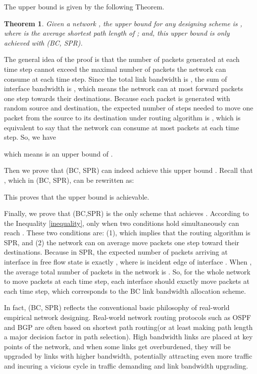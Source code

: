 \documentclass[journal]{IEEEtran}
\begin{document}
{The upper bound  is given by the following Theorem.
\newtheorem{thm}{Theorem}
\begin{thm}
\label{theorem} Given a network , the upper bound  for any
designing scheme is , where  is the average shortest path
length of ; and, this upper bound is only achieved with (BC,
SPR).
\end{thm}
\begin{IEEEproof}
The general idea of the proof is that the number of packets
generated at each time step cannot exceed the maximal number of
packets the network can consume at each time step. Since the total
link bandwidth is , the sum of interface bandwidth is , which
means the network can at most forward  packets one step towards
their destinations. Because each packet is generated with random
source and destination, the expected number of steps needed to move
one packet from the source to its destination under routing
algorithm  is , which is equivalent to say that
the network can consume at most  packets at each time
step. So, we have

which means  is an upper bound of .

Then we prove that (BC, SPR) can indeed achieve this upper bound
. Recall that , which
in (BC, SPR), can be rewritten as:

This proves that the upper bound  is achievable.

Finally, we prove that (BC,SPR) is the only scheme that achieves
. According to the Inequality \ref{inequality}, only when
two conditions hold simultaneously can  reach . These two
conditions are: (1), which implies that the routing
algorithm is SPR, and (2) the network can on average move 
packets one step toward their destinations.  Because in SPR, the
expected number of packets arriving at interface  in free flow
state is exactly , where  is
incident edge of interface . When , the average total
number of packets in the network is .
So, for the whole network to move  packets at each time step,
each interface should exactly move  packets
at each time step, which corresponds to the BC link bandwidth
allocation scheme.
\end{IEEEproof}

In fact, (BC, SPR) reflects the conventional basic philosophy of
real-world empirical network designing. Real-world network routing
protocols such as OSPF and BGP are often based on shortest path
routing(or at least making path length a major decision factor in
path selection). High bandwidth links are placed at key points of
the network, and when some links get overburdened, they will be
upgraded by links with higher bandwidth, potentially attracting even
more traffic and incuring a vicious cycle in traffic demanding and
link bandwidth upgrading.

}
\end{document}
